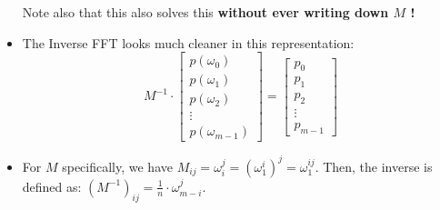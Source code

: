 \begin{itemize}
		Note also that this also solves this \textbf{without ever writing down \( M \) !} 
	\item The Inverse FFT looks much cleaner in this representation:
		\[
		M^{-1} \cdot \begin{bmatrix} p(\omega_0)\\p(\omega_1)\\p(\omega_2)\\ \vdots \\ p(\omega_{m-1}) \end{bmatrix} = 
		\begin{bmatrix} p_0\\p_1\\p_2\\ \vdots \\ p_{m-1} \end{bmatrix} 
		\] 
	\item For \( M \) specifically, we have \( M_{ij} = \omega_i^{j} = (\omega_1^{i})^{j} = \omega_1^{ij} \). Then, the inverse 
		is defined as: \( (M^{-1})_{ij} = \frac{1}{n} \cdot \omega_{m-i}^{j} \). 
\end{itemize}
